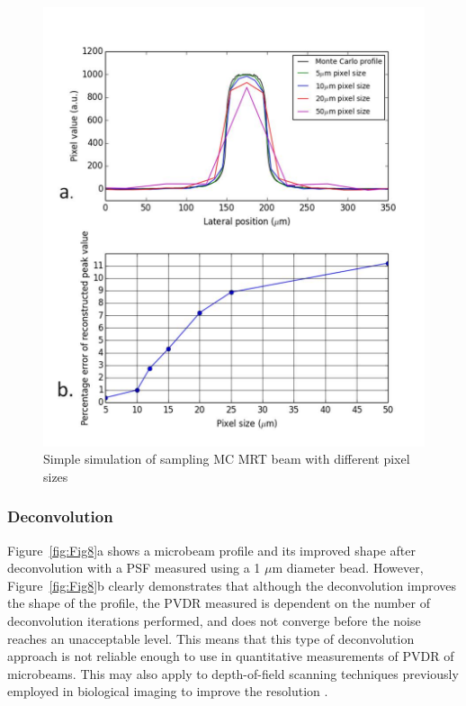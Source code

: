 		\begin{figure}
			\centering
			\includegraphics[width=0.8\linewidth]{mrt_img/Beam_10um_sampling}
			\caption{Simple simulation of sampling MC MRT beam with different pixel sizes}
			\label{fig:Beam_10um_sampling}
		\end{figure}
	
	\subsubsection{Deconvolution}
	Figure~\ref{fig:Fig8}a shows a microbeam profile and its improved shape after deconvolution with a PSF measured using a 1 $\mu$m diameter bead. However, Figure~\ref{fig:Fig8}b clearly demonstrates that although the deconvolution improves the shape of the profile, the PVDR measured is dependent on the number of deconvolution iterations performed, and does not converge before the noise reaches an unacceptable level. This means that this type of deconvolution approach is not reliable enough to use in quantitative measurements of PVDR of microbeams. This may also apply to depth-of-field scanning techniques previously employed in biological imaging to improve the resolution \cite{fauverthree-dimensional2005}. 
	

